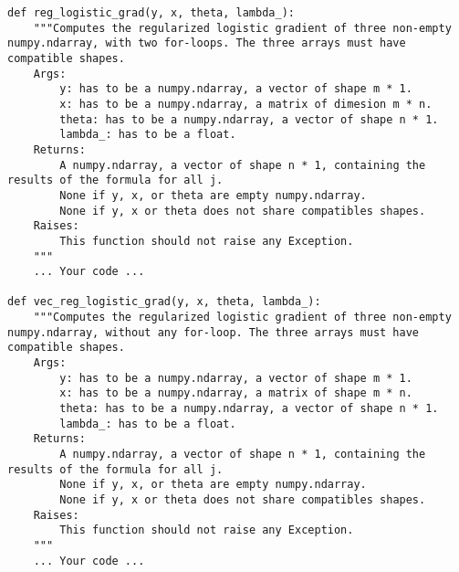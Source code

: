 \begin{verbatim}
def reg_logistic_grad(y, x, theta, lambda_):
	"""Computes the regularized logistic gradient of three non-empty numpy.ndarray, with two for-loops. The three arrays must have compatible shapes.
	Args:
		y: has to be a numpy.ndarray, a vector of shape m * 1.
		x: has to be a numpy.ndarray, a matrix of dimesion m * n.
		theta: has to be a numpy.ndarray, a vector of shape n * 1.
		lambda_: has to be a float.
	Returns:
		A numpy.ndarray, a vector of shape n * 1, containing the results of the formula for all j.
		None if y, x, or theta are empty numpy.ndarray.
		None if y, x or theta does not share compatibles shapes.
	Raises:
		This function should not raise any Exception.
	"""
	... Your code ...

def vec_reg_logistic_grad(y, x, theta, lambda_):
	"""Computes the regularized logistic gradient of three non-empty numpy.ndarray, without any for-loop. The three arrays must have compatible shapes.
	Args:
		y: has to be a numpy.ndarray, a vector of shape m * 1.
		x: has to be a numpy.ndarray, a matrix of shape m * n.
		theta: has to be a numpy.ndarray, a vector of shape n * 1.
		lambda_: has to be a float.
	Returns:
		A numpy.ndarray, a vector of shape n * 1, containing the results of the formula for all j.
		None if y, x, or theta are empty numpy.ndarray.
		None if y, x or theta does not share compatibles shapes.
	Raises:
		This function should not raise any Exception.
	"""
	... Your code ...
\end{verbatim}


